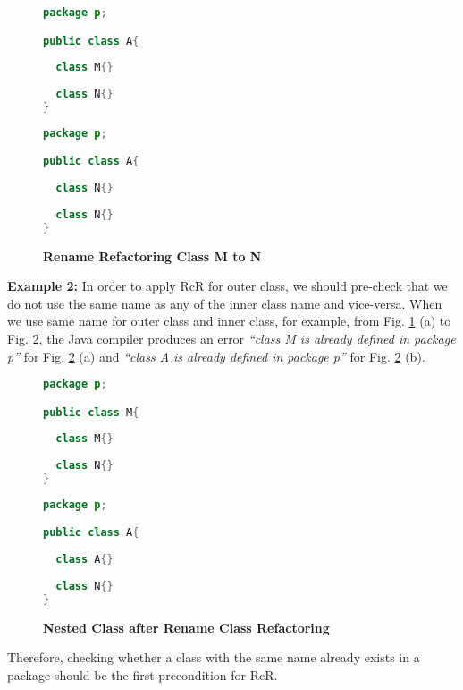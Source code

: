 \begin{figure}[th]
\centering
\begin{minipage}[t]{0.45\linewidth}
\begin{lstlisting}[language=java, basicstyle=\scriptsize\ttfamily,frame=single]
package p;

public class A{	
  
  class M{}
	
  class N{}
} 
\end{lstlisting}
\end{minipage}
\hfill
\begin{minipage}[t]{0.45\linewidth}
\begin{lstlisting}[language=java, basicstyle=\scriptsize\ttfamily,frame=single]
package p;

public class A{	
    
  class N{}
    
  class N{}
} 
\end{lstlisting}
\end{minipage}
\caption{\textbf{Rename Refactoring Class M to N}}
\label{figure:nestedclass1}
\end{figure}


\textbf{Example 2:} In order to apply RcR for outer class, we should pre-check that we do not use the same name as any of the inner class name and vice-versa. 
When we use same name for outer class and inner class, for example, from Fig. \ref{figure:nestedclass1} (a) to Fig. \ref{figure:nestedclass2},  the Java compiler produces an error \textit{``class M is already defined in package p''} for Fig. \ref{figure:nestedclass2} (a) and \textit{``class A is already defined in package p''} for Fig. \ref{figure:nestedclass2} (b).

\begin{figure}[th]
\centering
\begin{minipage}[t]{0.45\linewidth}
\begin{lstlisting}[language=java, basicstyle=\scriptsize\ttfamily,frame=single]
package p;

public class M{	
  
  class M{}
	
  class N{}
} 
\end{lstlisting}
\end{minipage}
\hfill
\begin{minipage}[t]{0.45\linewidth}
\begin{lstlisting}[language=java, basicstyle=\scriptsize\ttfamily,frame=single]
package p;

public class A{	
    
  class A{}
    
  class N{}
} 
\end{lstlisting}
\end{minipage}
\caption{\textbf{Nested Class after Rename Class Refactoring}}
\label{figure:nestedclass2}
\end{figure}

Therefore, checking whether a class with the same name already exists in a package should be the first precondition for RcR. 
   
